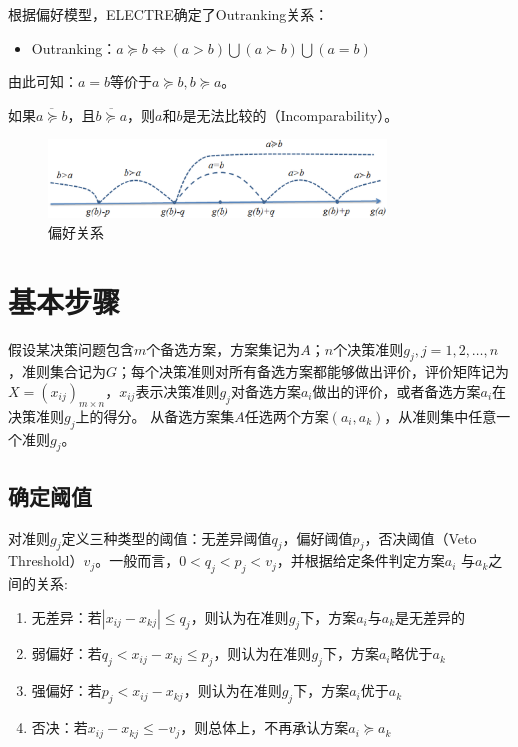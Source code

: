 根据偏好模型，ELECTRE确定了Outranking关系：
\begin{itemize}
  \item Outranking：$a\succeq b \Leftrightarrow (a>b)\bigcup(a\succ b)\bigcup(a=b)$
\end{itemize}
由此可知：$a=b$等价于$a\succeq b, b\succeq a$。

如果$\overline{a\succeq b}$，且$\overline{b\succeq a}$，则$a$和$b$是无法比较的（Incomparability）。

\begin{figure}[ht]
  \centering
  \includegraphics[width=0.8\textwidth]{figures/preferencerelation.eps}
  \caption{偏好关系}\label{fig:preferencerelation}
\end{figure}

\section{基本步骤}
假设某决策问题包含$m$个备选方案，方案集记为$A$；$n$个决策准则$g_j,j=1,2,\ldots,n$，准则集合记为$G$；每个决策准则对所有备选方案都能够做出评价，评价矩阵记为$X=(x_{ij})_{m\times n}$，$x_{ij}$表示决策准则$g_j$对备选方案$a_i$做出的评价，或者备选方案$a_i$在决策准则$g_j$上的得分。
从备选方案集$A$任选两个方案$(a_i,a_k)$，从准则集中任意一个准则$g_j$。

\subsection{确定阈值}
对准则$g_j$定义三种类型的阈值：无差异阈值$q_j$，偏好阈值$p_j$，否决阈值（Veto Threshold）$v_j$。一般而言，$0<q_j<p_j<v_j$，并根据给定条件判定方案$a_i$ 与$a_k$之间的关系:
\begin{enumerate}[（1）]
  \item 无差异：若$|x_{ij}-x_{kj} |\le q_j$，则认为在准则$g_j$下，方案$a_i$与$a_k$是无差异的
  \item 弱偏好：若$q_j<x_{ij}-x_{kj} \le p_j$，则认为在准则$g_j$下，方案$a_i$略优于$a_k$
  \item 强偏好：若$p_j<x_{ij}-x_{kj}$，则认为在准则$g_j$下，方案$a_i$优于$a_k$
  \item 否决：若$x_{ij}-x_{kj}\le -v_j$，则总体上，不再承认方案$a_i \succeq a_k$
\end{enumerate}

